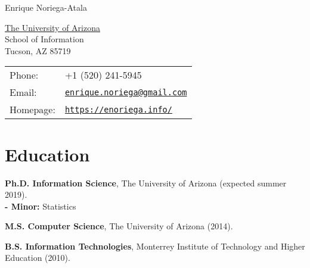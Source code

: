 \documentclass[letterpaper]{article}
\def\name{Enrique Noriega-Atala}
\renewenvironment{itemize}{
  \begin{list}{}{
    \setlength{\leftmargin}{1.5em}
  }
}{
  \end{list}
}
\begin{document}
{\huge \name}


\vspace{0.25in}

\begin{minipage}{0.45\linewidth}
  \href{http://www.unc.edu/}{The University of Arizona} \\
  School of Information \\
  Tucson, AZ 85719
\end{minipage}
\begin{minipage}{0.45\linewidth}
  \begin{tabular}{ll}
    Phone: & +1 (520) 241-5945 \\
    Email: & \href{mailto:enrique.noriega@gmail.com}{\tt enrique.noriega@gmail.com} \\
    Homepage: & \href{https://enoriega.info/}{\tt https://enoriega.info/} \\
  \end{tabular}
\end{minipage}


%


\section*{Education}

\begin{itemize}
  \item \textbf{Ph.D. Information Science}, The University of Arizona (expected summer 2019). \\
     \textbf{- Minor:} Statistics
  \item \textbf{M.S. Computer Science}, The University of Arizona (2014).
  \item \textbf{B.S. Information Technologies}, Monterrey Institute of Technology and Higher Education (2010).
\end{itemize}
\end{document}
